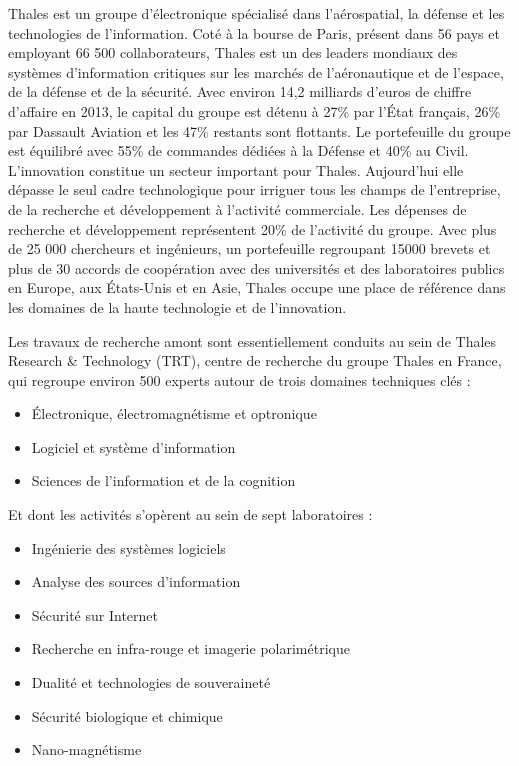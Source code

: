 Thales est un groupe d’\'electronique sp\'ecialis\'e dans l’a\'erospatial, la d\'efense et les technologies de l’information. Cot\'e à la bourse de Paris, pr\'esent dans 56 pays et employant 66 500 collaborateurs, Thales est un des leaders mondiaux des systèmes d’information critiques sur les march\'es de l’a\'eronautique et de l’espace, de la d\'efense et de la s\'ecurit\'e. Avec environ 14,2 milliards d’euros de chiffre d’affaire en 2013, le capital du groupe est d\'etenu à 27\% par l’État français, 26\% par Dassault Aviation et les 47\% restants sont flottants. Le portefeuille du groupe est \'equilibr\'e avec 55\% de commandes d\'edi\'ees à la D\'efense et 40\% au Civil. L’innovation constitue un secteur important pour Thales. Aujourd’hui elle d\'epasse le seul cadre technologique pour irriguer tous les champs de l’entreprise, de la recherche et d\'eveloppement à l’activit\'e commerciale.  Les d\'epenses de recherche et d\'eveloppement repr\'esentent 20\% de l'activit\'e du groupe. Avec plus de 25 000 chercheurs et ing\'enieurs, un portefeuille regroupant 15000 brevets et plus de 30 accords de coop\'eration avec des universit\'es et des laboratoires publics en Europe, aux États-Unis et en Asie, Thales occupe une place de r\'ef\'erence dans les domaines de la haute technologie et de l’innovation.

Les travaux de recherche amont sont essentiellement conduits au sein de Thales Research \& Technology (TRT), centre de recherche du groupe Thales en France, qui regroupe environ 500 experts autour de trois domaines techniques cl\'es :

\begin{itemize}
  \item Électronique, \'electromagn\'etisme et optronique
  \item Logiciel et système d’information
  \item Sciences de l’information et de la cognition
\end{itemize}
  
Et dont les activit\'es s’opèrent au sein de sept laboratoires :

\begin{itemize}
  \item Ing\'enierie des systèmes logiciels
  \item Analyse des sources d’information
  \item S\'ecurit\'e sur Internet
  \item Recherche en infra-rouge et imagerie polarim\'etrique
  \item Dualit\'e et technologies de souverainet\'e
  \item S\'ecurit\'e biologique et chimique
  \item Nano-magn\'etisme
\end{itemize}

